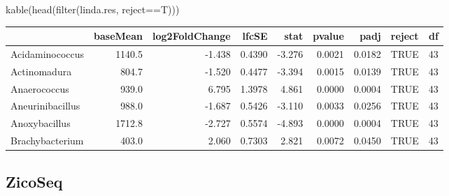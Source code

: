 \documentclass[
]{book}
\newenvironment{Shaded}{\begin{snugshade}}{\end{snugshade}}
\newcommand{\FunctionTok}[1]{\textcolor[rgb]{0.00,0.00,0.00}{#1}}
\newcommand{\NormalTok}[1]{#1}
\newcommand{\OtherTok}[1]{\textcolor[rgb]{0.56,0.35,0.01}{#1}}
\newcommand{\SpecialCharTok}[1]{\textcolor[rgb]{0.00,0.00,0.00}{#1}}
\begin{document}
\begin{Shaded}
\end{Shaded}

\begin{Shaded}
\begin{Highlighting}[]
\FunctionTok{kable}\NormalTok{(}\FunctionTok{head}\NormalTok{(}\FunctionTok{filter}\NormalTok{(linda.res, reject}\SpecialCharTok{==}\NormalTok{T)))}
\end{Highlighting}
\end{Shaded}

\begin{tabular}{l|r|r|r|r|r|r|l|r}
\hline
  & baseMean & log2FoldChange & lfcSE & stat & pvalue & padj & reject & df\\
\hline
Acidaminococcus & 1140.5 & -1.438 & 0.4390 & -3.276 & 0.0021 & 0.0182 & TRUE & 43\\
\hline
Actinomadura & 804.7 & -1.520 & 0.4477 & -3.394 & 0.0015 & 0.0139 & TRUE & 43\\
\hline
Anaerococcus & 939.0 & 6.795 & 1.3978 & 4.861 & 0.0000 & 0.0004 & TRUE & 43\\
\hline
Aneurinibacillus & 988.0 & -1.687 & 0.5426 & -3.110 & 0.0033 & 0.0256 & TRUE & 43\\
\hline
Anoxybacillus & 1712.8 & -2.727 & 0.5574 & -4.893 & 0.0000 & 0.0004 & TRUE & 43\\
\hline
Brachybacterium & 403.0 & 2.060 & 0.7303 & 2.821 & 0.0072 & 0.0450 & TRUE & 43\\
\hline
\end{tabular}

\hypertarget{zicoseq-1}{%
\subsection{ZicoSeq}\label{zicoseq-1}}
\end{document}
